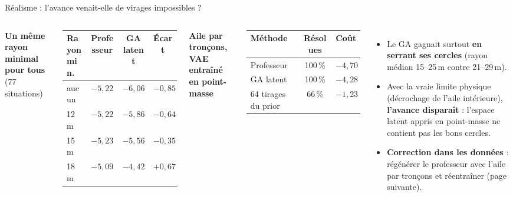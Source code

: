 \documentclass[aspectratio=169,10pt]{beamer}
\newcommand{\good}[1]{\textcolor{climb}{\textbf{#1}}}
\newcommand{\bad}[1]{\textcolor{sink}{\textbf{#1}}}
\begin{document}
\begin{frame}{Réalisme : l'avance venait-elle de virages impossibles ?}
  \begin{columns}[T]
    \scriptsize
    \textbf{Un même rayon minimal pour tous} (77 situations)\par\smallskip
    \begin{tabular}{@{}lccc@{}}
      \toprule
      Rayon min. & Professeur & GA latent & Écart \\ \midrule
      aucun & $-5{,}22$ & $-6{,}06$ & \good{$-0{,}85$} \\
      12\,m & $-5{,}22$ & $-5{,}86$ & \good{$-0{,}64$} \\
      15\,m & $-5{,}23$ & $-5{,}56$ & \good{$-0{,}35$} \\
      18\,m & $-5{,}09$ & $-4{,}42$ & \bad{$+0{,}67$} \\
      \bottomrule
    \end{tabular}\par\medskip
    \textbf{Aile par tronçons, VAE entraîné en point-masse}\par\smallskip
    \begin{tabular}{@{}lcc@{}}
      \toprule
      Méthode & Résolues & Coût \\ \midrule
      Professeur & 100\,\% & $-4{,}70$ \\
      GA latent & 100\,\% & \bad{$-4{,}28$} \\
      64 tirages du prior & 66\,\% & $-1{,}23$ \\
      \bottomrule
    \end{tabular}
    \small
    \begin{itemize}
      \item Le GA gagnait surtout \textbf{en serrant ses cercles} (rayon médian 15--25\,m contre 21--29\,m).
      \item Avec la vraie limite physique (décrochage de l'aile intérieure), \bad{l'avance disparaît} : l'espace latent appris en point-masse ne contient pas les bons cercles.
      \item \textbf{Correction dans les données} : régénérer le professeur avec l'aile par tronçons et réentraîner (page suivante).
    \end{itemize}
  \end{columns}
\end{frame}
\end{document}
